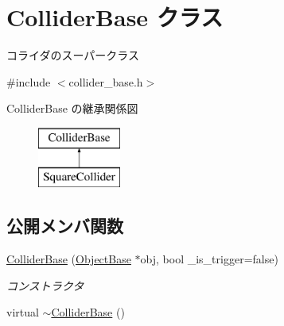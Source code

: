 \hypertarget{class_collider_base}{}\section{Collider\+Base クラス}
\label{class_collider_base}


コライダのスーパークラス  




{\ttfamily \#include $<$collider\+\_\+base.\+h$>$}

Collider\+Base の継承関係図\begin{figure}[H]
\begin{center}
\leavevmode
\includegraphics[height=2.000000cm]{class_collider_base}
\end{center}
\end{figure}
\subsection*{公開メンバ関数}
\begin{DoxyCompactItemize}
\item 
\mbox{\hyperlink{class_collider_base_a61d7057a7e05549088f2b15c1e525858}{Collider\+Base}} (\mbox{\hyperlink{class_object_base}{Object\+Base}} $\ast$obj, bool \+\_\+is\+\_\+trigger=false)
\begin{DoxyCompactList}\small\item\em コンストラクタ \end{DoxyCompactList}\item 
virtual \mbox{\hyperlink{class_collider_base_a485c8a6348a053228aa61142a71e48fb}{$\sim$\+Collider\+Base}} ()
\end{DoxyCompactItemize}
